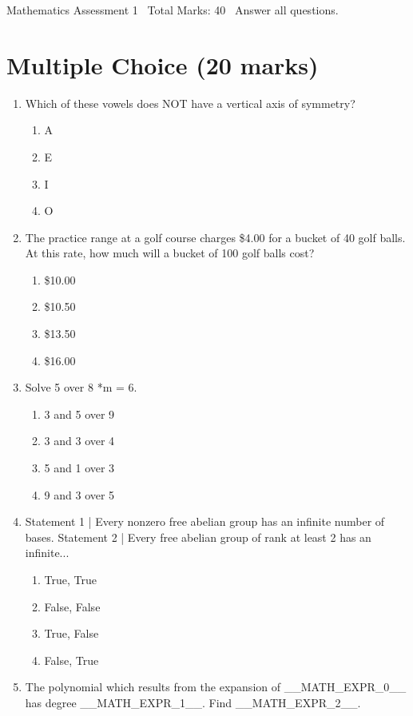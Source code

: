 \documentclass[12pt]{article}
\begin{document}
\begin{center}
Mathematics Assessment 1 \
Total Marks: 40 \
Answer all questions.
\end{center}

\section*{Multiple Choice (20 marks)}
\begin{enumerate}[label=\arabic*.]
\item Which of these vowels does NOT have a vertical axis of symmetry?
\begin{enumerate}[label=(\alph*)]
    \item A
    \item E
    \item I
    \item O
\end{enumerate}
\item The practice range at a golf course charges \$4.00 for a bucket of 40 golf balls. At this rate, how much will a bucket of 100 golf balls cost?
\begin{enumerate}[label=(\alph*)]
    \item \$10.00
    \item \$10.50
    \item \$13.50
    \item \$16.00
\end{enumerate}
\item Solve 5 over 8 *m = 6.
\begin{enumerate}[label=(\alph*)]
    \item 3 and 5 over 9
    \item 3 and 3 over 4
    \item 5 and 1 over 3
    \item 9 and 3 over 5
\end{enumerate}
\item Statement 1 | Every nonzero free abelian group has an infinite number of bases. Statement 2 | Every free abelian group of rank at least 2 has an infinite...
\begin{enumerate}[label=(\alph*)]
    \item True, True
    \item False, False
    \item True, False
    \item False, True
\end{enumerate}
\item The polynomial which results from the expansion of \_\_MATH\_EXPR\_0\_\_ has degree \_\_MATH\_EXPR\_1\_\_. Find \_\_MATH\_EXPR\_2\_\_.

\end{enumerate}
\end{document}
